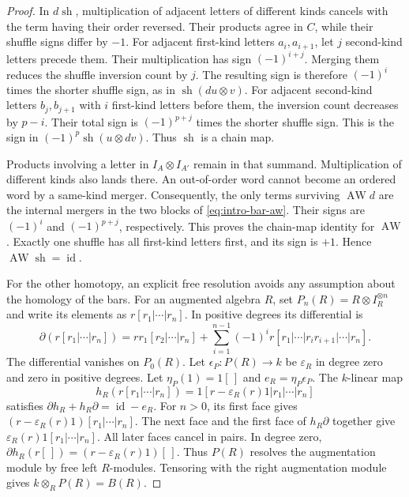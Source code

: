 \begin{proof}
In $d\operatorname{sh}$, multiplication of adjacent letters of
different kinds cancels with the term having their order reversed.
Their products agree in $C$, while their shuffle signs differ by $-1$.
For adjacent first-kind letters $a_i,a_{i+1}$, let $j$ second-kind
letters precede them. Their multiplication has sign $(-1)^{i+j}$.
Merging them reduces the shuffle inversion count by $j$.
The resulting sign is therefore $(-1)^i$ times the shorter shuffle
sign, as in $\operatorname{sh}(du\otimes v)$.
For adjacent second-kind letters $b_j,b_{j+1}$ with $i$ first-kind
letters before them, the inversion count decreases by $p-i$.
Their total sign is $(-1)^{p+j}$ times the shorter shuffle sign.
This is the sign in $(-1)^p\operatorname{sh}(u\otimes dv)$.
Thus $\operatorname{sh}$ is a chain map.

Products involving a letter in $I_A\otimes I_{A'}$ remain in that
summand. Multiplication of different kinds also lands there.
An out-of-order word cannot become an ordered word by a same-kind
merger. Consequently, the only terms surviving $\operatorname{AW}d$
are the internal mergers in the two blocks of
\eqref{eq:intro-bar-aw}. Their signs are $(-1)^i$ and $(-1)^{p+j}$,
respectively. This proves the chain-map identity for
$\operatorname{AW}$. Exactly one shuffle has all first-kind letters
first, and its sign is $+1$. Hence
$\operatorname{AW}\operatorname{sh}=\operatorname{id}$.

For the other homotopy, an explicit free resolution avoids any
assumption about the homology of the bars. For an augmented algebra
$R$, set $P_n(R)=R\otimes I_R^{\otimes n}$ and write its elements
as $r[r_1|\cdots|r_n]$. In positive degrees its differential is
\[
 \partial(r[r_1|\cdots|r_n])
 =rr_1[r_2|\cdots|r_n]
 +\sum_{i=1}^{n-1}(-1)^i
 r[r_1|\cdots|r_ir_{i+1}|\cdots|r_n].
\]
The differential vanishes on $P_0(R)$.
Let $\epsilon_P\colon P(R)\to k$ be $\varepsilon_R$ in degree zero
and zero in positive degrees. Let $\eta_P(1)=1[\,]$ and
$e_R=\eta_P\epsilon_P$. The $k$-linear map
\[
 h_R(r[r_1|\cdots|r_n])
 =1[r-\varepsilon_R(r)1|r_1|\cdots|r_n]
\]
satisfies $\partial h_R+h_R\partial=\operatorname{id}-e_R$.
For $n>0$, its first face gives
$(r-\varepsilon_R(r)1)[r_1|\cdots|r_n]$.
The next face and the first face of $h_R\partial$ together give
$\varepsilon_R(r)1[r_1|\cdots|r_n]$. All later faces cancel in pairs.
In degree zero, $\partial h_R(r[\,])=(r-\varepsilon_R(r)1)[\,]$.
Thus $P(R)$ resolves the
augmentation module by free left $R$-modules. Tensoring with the
right augmentation module gives $k\otimes_R P(R)=B(R)$.


\end{proof}
